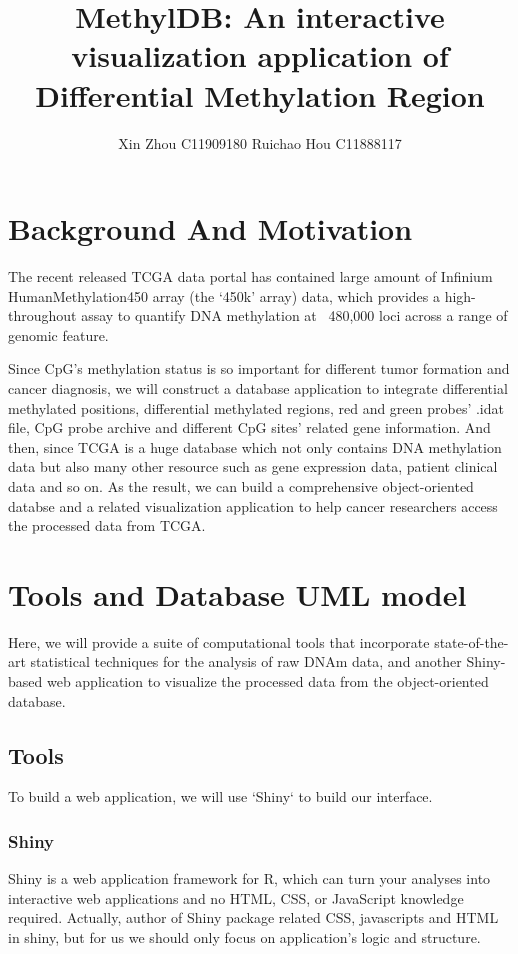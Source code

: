 \documentclass{article}\usepackage[]{graphicx}\usepackage[]{color}
\begin{document}
\title{MethylDB: An interactive visualization application of Differential Methylation Region }
\author{Xin Zhou C11909180 \quad \quad \quad \quad \quad Ruichao Hou C11888117 \\}
\maketitle


\section{Background And Motivation}
The recent released TCGA data portal has contained large amount of Infinium HumanMethylation450 array (the ‘450k’ array) data, which provides a high-throughout assay to quantify DNA methylation at ~480,000 loci across a range of genomic feature.

Since CpG's methylation status is so important for different tumor formation and cancer diagnosis, we will construct a database application to integrate differential methylated positions, differential methylated regions, red and green probes' .idat file, CpG probe archive and different CpG sites' related gene information. And then, since TCGA is a huge database which not only contains DNA methylation data but also many other resource such as gene expression data, patient clinical data and so on. As the result, we can build a comprehensive object-oriented databse and a related visualization application to help cancer researchers access the processed data from TCGA.

\section{Tools and Database UML model}
Here, we will provide a suite of computational tools that incorporate state-of-the-art statistical techniques for the analysis of raw DNAm data, and another Shiny-based web application to visualize the processed data from the object-oriented database.

\subsection{Tools}
To build a web application, we will use `Shiny` to build our interface. 

\subsubsection{Shiny}
Shiny is a web application framework for R, which can turn your analyses into interactive web applications
and no HTML, CSS, or JavaScript knowledge required. Actually, author of Shiny package related CSS, javascripts and HTML in shiny, but for us we should only focus on application's logic and structure.
\end{document}
